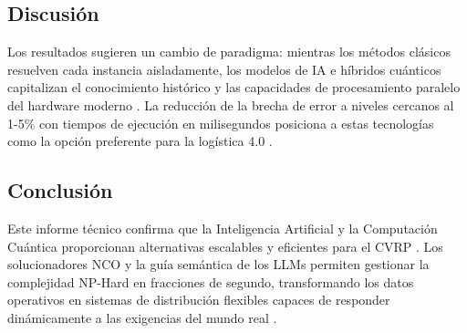\documentclass[a4paper, 11pt]{article}
\begin{document}
\subsection{Discusión}
Los resultados sugieren un cambio de paradigma: mientras los métodos clásicos resuelven cada instancia aisladamente, los modelos de IA e híbridos cuánticos capitalizan el conocimiento histórico y las capacidades de procesamiento paralelo del hardware moderno \cite{ref8,ref12}. La reducción de la brecha de error a niveles cercanos al 1-5\% con tiempos de ejecución en milisegundos posiciona a estas tecnologías como la opción preferente para la logística 4.0 \cite{ref20}.

\subsection{Conclusión}
Este informe técnico confirma que la Inteligencia Artificial y la Computación Cuántica proporcionan alternativas escalables y eficientes para el CVRP \cite{ref12,ref14}. Los solucionadores NCO y la guía semántica de los LLMs permiten gestionar la complejidad NP-Hard en fracciones de segundo, transformando los datos operativos en sistemas de distribución flexibles capaces de responder dinámicamente a las exigencias del mundo real \cite{ref1,ref4}.
\end{document}
